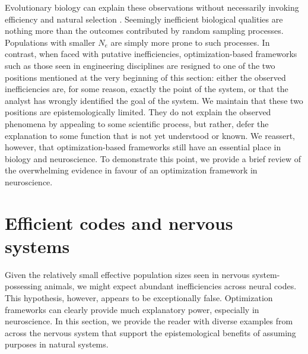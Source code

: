 \documentclass[twocolumn]{article}
\begin{document}
Evolutionary biology can explain these observations without necessarily invoking efficiency and natural selection \cite{Lynch_2007}. Seemingly inefficient biological qualities are nothing more than the outcomes contributed by random sampling processes. Populations with smaller $N_e$ are simply more prone to such processes. In contrast, when faced with putative inefficiencies, optimization-based frameworks such as those seen in engineering disciplines are resigned to one of the two positions mentioned at the very beginning of this section: either the observed inefficiencies are, for some reason, exactly the point of the system, or that the analyst has wrongly identified the goal of the system. We maintain that these two positions are epistemologically limited. They do not explain the observed phenomena by appealing to some scientific process, but rather, defer the explanation to some function that is not yet understood or known. We reassert, however, that optimization-based frameworks still have an essential place in biology and neuroscience. To demonstrate this point, we provide a brief review of the overwhelming evidence in favour of an optimization framework in neuroscience. 

\section{Efficient codes and nervous systems}

Given the relatively small effective population sizes seen in nervous system-possessing animals, we might expect abundant inefficiencies across neural codes. This hypothesis, however, appears to be exceptionally false. Optimization frameworks can clearly provide much explanatory power, especially in neuroscience. In this section, we provide the reader with diverse examples from across the nervous system that support the epistemological benefits of assuming purposes in natural systems. 
\end{document}
